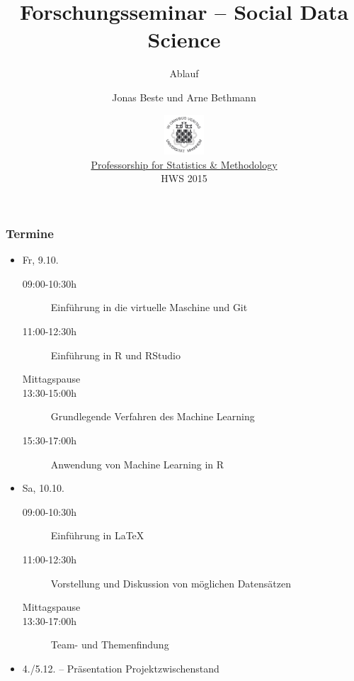 \documentclass{beamer}
\title{Forschungsseminar -- Social Data Science}
\subtitle{Ablauf}
\author[Beste \& Bethmann]{Jonas Beste und Arne Bethmann}
\date{\includegraphics[height=1.5cm]{../../img/150px-Uni_Mannheim_Siegel.png} \\
  \href{http://sswml.uni-mannheim.de/}{Professorship for Statistics \& Methodology} \\
  HWS 2015}
\begin{document}
\begin{frame}
  \titlepage
\end{frame}


\begin{frame}
  \frametitle{Termine}
  \begin{itemize}
  \item Fr, 9.10.
    \begin{description}
    \item[09:00-10:30h] Einführung in die virtuelle Maschine und Git
    \item[11:00-12:30h] Einführung in R und RStudio
    \item[Mittagspause]
    \item[13:30-15:00h] Grundlegende Verfahren des Machine Learning
    \item[15:30-17:00h] Anwendung von Machine Learning in R
    \end{description}
  \item Sa, 10.10.
    \begin{description}
    \item[09:00-10:30h] Einführung in \LaTeX
    \item[11:00-12:30h] Vorstellung und Diskussion von möglichen Datensätzen
    \item[Mittagspause]
    \item[13:30-17:00h] Team- und Themenfindung
    \end{description}
  \item 4./5.12. -- Präsentation Projektzwischenstand
  \end{itemize}
\end{frame}
\end{document}
